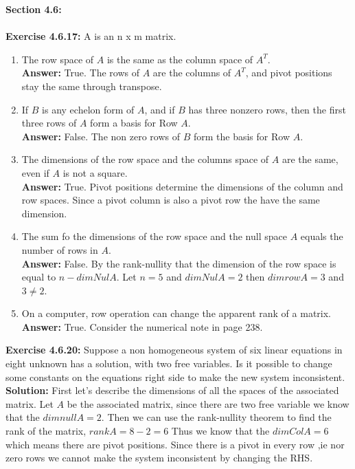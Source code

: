 \documentclass{amsart}
\begin{document}
{\huge\textbf{Section 4.6:}}\\\\
\noindent\textbf{Exercise 4.6.17: } A is an n x m matrix.\\
\begin{enumerate}

\item The row space of $A$ is the same as the column space of $A^T$.\\
\noindent \textbf{Answer: } True. The rows of $A$ are the columns of $A^T$, and pivot positions stay the same through transpose.
\vspace{1in}

\item If $B$ is any echelon form of $A$, and if $B$ has three nonzero rows, then the first three rows of $A$ form a basis for Row $A$.\\
\noindent \textbf{Answer: } False. The non zero rows of $B$ form the basis for Row $A$.
\vspace{1in}

\item The dimensions of the row space and the columns space of $A$ are the same, even if $A$ is not a square.\\
\noindent \textbf{Answer: } True. Pivot positions determine the dimensions of the column and row spaces. Since a pivot column is also a pivot row the have the same dimension.
\vspace{1in}

\item The sum fo the dimensions of the row space and the null space $A$ equals the number of rows in $A$.\\
\noindent \textbf{Answer: } False. By the rank-nullity that the dimension of the row space is equal to $n - dim Nul A$. Let $n = 5$ and $dim Nul A = 2$  then $dim row A  = 3$ and $3 \neq 2$.
\vspace{1in}

\item On a computer, row operation can change the apparent rank of a matrix.\\
\noindent \textbf{Answer: } True.  Consider the numerical note in page 238.
\vspace{1in}

\end{enumerate}

\noindent\textbf{Exercise 4.6.20: }Suppose a non homogeneous system of six linear equations in eight unknown has a solution, with two free variables. Is it possible to change some constants on the equations right side to make the new system inconsistent. 
\noindent \textbf{Solution: } First let's describe the dimensions of all the spaces of the associated matrix. Let $A$ be the associated matrix, since there are two free variable we know that the $dim null A  = 2$. Then we can use the rank-nullity theorem to find the rank of the matrix, $rank A = 8 - 2 = 6$ Thus we know that the $dim Col A  = 6$ which means there are pivot positions. Since there is a pivot in every row ,ie nor zero rows we cannot make the system inconsistent by changing the RHS.
\vspace{1in}
\end{document}
